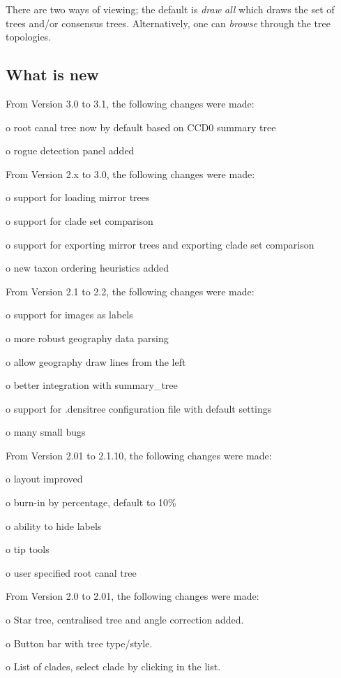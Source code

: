 \documentclass{article}
\begin{document}
There are two ways of viewing; the default is {\em draw all} which draws the set 
of trees and/or consensus trees. Alternatively, one can {\em browse} through the
tree topologies.

\subsection{What is new \label{ssec.new}}


\noindent From Version 3.0 to 3.1, the following changes were made:

o root canal tree now by default based on CCD0 summary tree \cite{CCD}

o rogue detection panel added \cite{rogues}

\noindent From Version 2.x to 3.0, the following changes were made:

o support for loading mirror trees

o support for clade set comparison

o support for exporting mirror trees and exporting clade set comparison

o new taxon ordering heuristics added

\noindent From Version 2.1 to 2.2, the following changes were made:

o support for images as labels

o more robust geography data parsing

o allow geography draw lines from the left

o better integration with summary\_tree

o support for .densitree configuration file with default settings

o many small bugs

\noindent From Version 2.01 to 2.1.10, the following changes were made:

o layout improved

o burn-in by percentage, default to 10\%

o ability to hide labels

o tip tools

o user specified root canal tree

\noindent From Version 2.0 to 2.01, the following changes were made:

o Star tree, centralised tree and angle correction added.

o Button bar with tree type/style.

o List of clades, select clade by clicking in the list.
\end{document}
